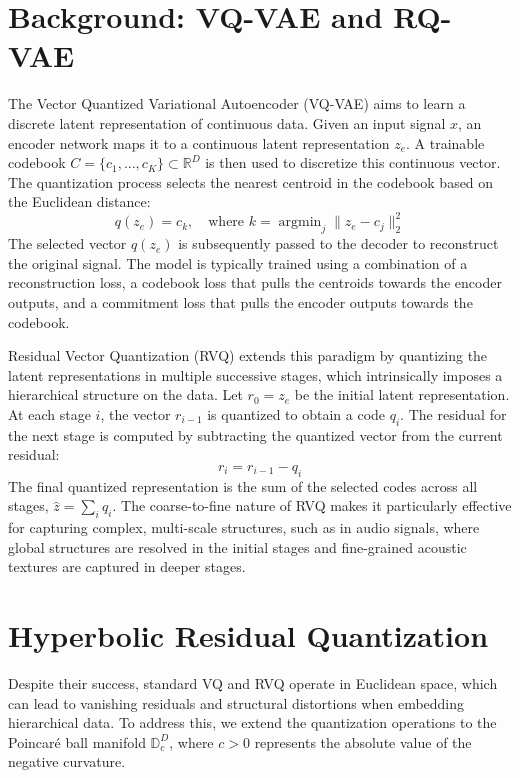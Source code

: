 \documentclass[12pt]{report}
\begin{document}
\section{Background: VQ-VAE and RQ-VAE}
The Vector Quantized Variational Autoencoder (VQ-VAE) \cite{vqvae} aims to learn a discrete latent representation of continuous data. Given an input signal $x$, an encoder network maps it to a continuous latent representation $z_e$. A trainable codebook $C = \{c_1, \dots, c_K\} \subset \mathbb{R}^D$ is then used to discretize this continuous vector. The quantization process selects the nearest centroid in the codebook based on the Euclidean distance:
\begin{equation}
    q(z_e) = c_k, \quad \text{where } k = \operatorname{argmin}_j \| z_e - c_j \|^2_2
\end{equation}
The selected vector $q(z_e)$ is subsequently passed to the decoder to reconstruct the original signal. The model is typically trained using a combination of a reconstruction loss, a codebook loss that pulls the centroids towards the encoder outputs, and a commitment loss that pulls the encoder outputs towards the codebook.

Residual Vector Quantization (RVQ) \cite{soundstream} extends this paradigm by quantizing the latent representations in multiple successive stages, which intrinsically imposes a hierarchical structure on the data. Let $r_0 = z_e$ be the initial latent representation. At each stage $i$, the vector $r_{i-1}$ is quantized to obtain a code $q_i$. The residual for the next stage is computed by subtracting the quantized vector from the current residual:
\begin{equation}
    r_i = r_{i-1} - q_i
\end{equation}
The final quantized representation is the sum of the selected codes across all stages, $\hat{z} = \sum_i q_i$. The coarse-to-fine nature of RVQ makes it particularly effective for capturing complex, multi-scale structures, such as in audio signals, where global structures are resolved in the initial stages and fine-grained acoustic textures are captured in deeper stages.

\section{Hyperbolic Residual Quantization}
Despite their success, standard VQ and RVQ operate in Euclidean space, which can lead to vanishing residuals and structural distortions when embedding hierarchical data. To address this, we extend the quantization operations to the Poincar\'e ball manifold $\mathbb{D}_c^D$, where $c > 0$ represents the absolute value of the negative curvature.
\end{document}
